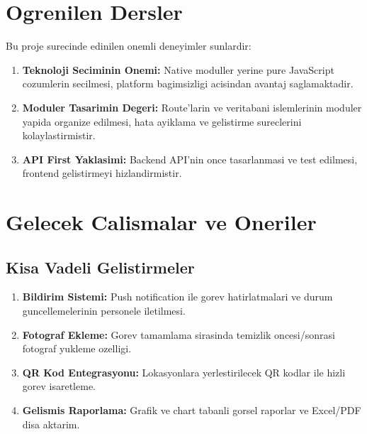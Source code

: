 \section{Ogrenilen Dersler}
\label{sec:ogrenilen-dersler}

Bu proje surecinde edinilen onemli deneyimler sunlardir:

\begin{enumerate}
    \item \textbf{Teknoloji Seciminin Onemi:} Native moduller yerine 
    pure JavaScript cozumlerin secilmesi, platform bagimsizligi 
    acisindan avantaj saglamaktadir.
    
    \item \textbf{Moduler Tasarimin Degeri:} Route'larin ve 
    veritabani islemlerinin moduler yapida organize edilmesi, 
    hata ayiklama ve gelistirme sureclerini kolaylastirmistir.
    
    \item \textbf{API First Yaklasimi:} Backend API'nin once 
    tasarlanmasi ve test edilmesi, frontend gelistirmeyi 
    hizlandirmistir.
\end{enumerate}

\section{Gelecek Calismalar ve Oneriler}
\label{sec:gelecek-calismalar}

\subsection{Kisa Vadeli Gelistirmeler}
\label{subsec:kisa-vadeli}

\begin{enumerate}
    \item \textbf{Bildirim Sistemi:} Push notification ile gorev 
    hatirlatmalari ve durum guncellemelerinin personele iletilmesi.
    
    \item \textbf{Fotograf Ekleme:} Gorev tamamlama sirasinda 
    temizlik oncesi/sonrasi fotograf yukleme ozelligi.
    
    \item \textbf{QR Kod Entegrasyonu:} Lokasyonlara yerlestirilecek 
    QR kodlar ile hizli gorev isaretleme.
    
    \item \textbf{Gelismis Raporlama:} Grafik ve chart tabanli 
    gorsel raporlar ve Excel/PDF disa aktarim.
\end{enumerate}

